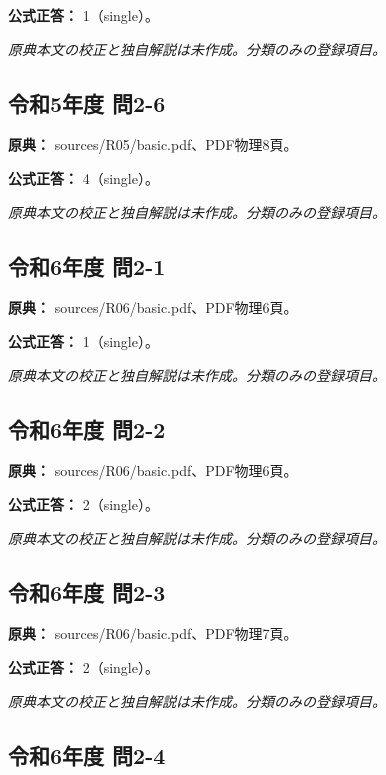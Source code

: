 \textbf{公式正答：} 1（single）。

\par\textit{原典本文の校正と独自解説は未作成。分類のみの登録項目。}

\subsection{令和5年度 問2-6}
\label{q:r05-reg-basic-2-6}

\noindent\textbf{原典：} sources/R05/basic.pdf、PDF物理8頁。

\textbf{公式正答：} 4（single）。

\par\textit{原典本文の校正と独自解説は未作成。分類のみの登録項目。}

\subsection{令和6年度 問2-1}
\label{q:r06-reg-basic-2-1}

\noindent\textbf{原典：} sources/R06/basic.pdf、PDF物理6頁。

\textbf{公式正答：} 1（single）。

\par\textit{原典本文の校正と独自解説は未作成。分類のみの登録項目。}

\subsection{令和6年度 問2-2}
\label{q:r06-reg-basic-2-2}

\noindent\textbf{原典：} sources/R06/basic.pdf、PDF物理6頁。

\textbf{公式正答：} 2（single）。

\par\textit{原典本文の校正と独自解説は未作成。分類のみの登録項目。}

\subsection{令和6年度 問2-3}
\label{q:r06-reg-basic-2-3}

\noindent\textbf{原典：} sources/R06/basic.pdf、PDF物理7頁。

\textbf{公式正答：} 2（single）。

\par\textit{原典本文の校正と独自解説は未作成。分類のみの登録項目。}

\subsection{令和6年度 問2-4}
\label{q:r06-reg-basic-2-4}

